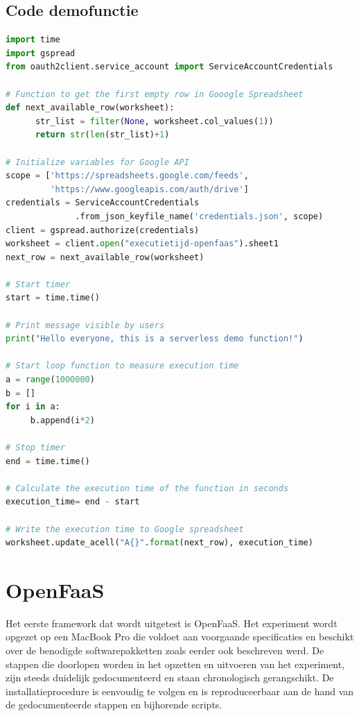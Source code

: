 \newpage
\subsection{Code demofunctie}
\label{sec:demofunctie}
\begin{lstlisting}[language=python]
import time
import gspread
from oauth2client.service_account import ServiceAccountCredentials

# Function to get the first empty row in Gooogle Spreadsheet
def next_available_row(worksheet):
      str_list = filter(None, worksheet.col_values(1)) 
      return str(len(str_list)+1)

# Initialize variables for Google API
scope = ['https://spreadsheets.google.com/feeds',
         'https://www.googleapis.com/auth/drive']
credentials = ServiceAccountCredentials
              .from_json_keyfile_name('credentials.json', scope)
client = gspread.authorize(credentials)
worksheet = client.open("executietijd-openfaas").sheet1
next_row = next_available_row(worksheet)

# Start timer 
start = time.time()

# Print message visible by users
print("Hello everyone, this is a serverless demo function!")

# Start loop function to measure execution time
a = range(1000000)
b = []
for i in a:
     b.append(i*2)

# Stop timer
end = time.time()

# Calculate the execution time of the function in seconds
execution_time= end - start

# Write the execution time to Google spreadsheet
worksheet.update_acell("A{}".format(next_row), execution_time)
\end{lstlisting}

\newpage
\section{OpenFaaS}
Het eerste framework dat wordt uitgetest is OpenFaaS. Het experiment wordt opgezet op een MacBook Pro die voldoet aan voorgaande specificaties en beschikt over de benodigde softwarepakketten zoals eerder ook beschreven werd. De stappen die doorlopen worden in het opzetten en uitvoeren van het experiment, zijn steeds duidelijk gedocumenteerd en staan chronologisch gerangschikt. De installatieprocedure is eenvoudig te volgen en is reproduceerbaar aan de hand van de gedocumenteerde stappen en bijhorende scripts.


